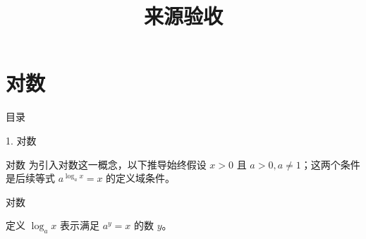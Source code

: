\documentclass[aspectratio=169,10pt,fontset=fandol]{ctexbeamer}
\title{来源验收}
\begin{document}
\section{对数}
\begin{frame}[t,fragile]{目录}
\normalsize
{\color{blue}\normalsize 1. 对数\par}\vspace{0.22em}
\end{frame}
\begin{frame}[t,fragile]{对数}
\normalsize
{\normalsize
为引入对数这一概念，以下推导始终假设 $x>0$ 且 $a>0,a\ne1$；这两个条件是后续等式 $a^{\log_a x}=x$ 的定义域条件。
}
\end{frame}
\begin{frame}[t,fragile]{对数}
\normalsize
\begin{block}{定义}
{\normalsize
$\log_a x$ 表示满足 $a^y=x$ 的数 $y$。
}
\end{block}
\end{frame}
\end{document}

